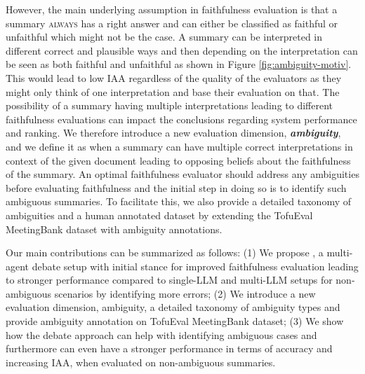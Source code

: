 However, the main underlying assumption in faithfulness evaluation is that a summary \textsc{always} has a right answer and can either be classified as faithful or unfaithful which might not be the case. 
A summary can be interpreted in different correct and plausible ways and then depending on the interpretation can be seen as both faithful and unfaithful as shown in Figure \ref{fig:ambiguity-motiv}. This would lead to low IAA regardless of the quality of the evaluators as they might only think of one interpretation and base their evaluation on that. 
The possibility of a summary having multiple interpretations leading to different faithfulness evaluations can impact the conclusions regarding system performance and ranking.
We therefore introduce a new evaluation dimension, \textbf{\textit{ambiguity}}, and we define it as when a summary can have multiple correct interpretations in context of the given document leading to opposing beliefs about the faithfulness of the summary. 
An optimal faithfulness evaluator should address any ambiguities before evaluating faithfulness and the initial step in doing so is to identify such ambiguous summaries.
To facilitate this, we also provide a detailed taxonomy of ambiguities and a human annotated dataset by extending the TofuEval MeetingBank dataset \cite{tang2024tofueval} with ambiguity annotations.

Our main contributions can be summarized as follows:
(1) We propose \method, a multi-agent debate setup with initial stance for improved faithfulness evaluation leading to stronger performance compared to single-LLM and multi-LLM setups for non-ambiguous scenarios by identifying more errors;
(2) We introduce a new evaluation dimension, ambiguity, a detailed taxonomy of ambiguity types and provide ambiguity annotation on TofuEval MeetingBank dataset;
(3) We show how the debate approach can help with identifying ambiguous cases and furthermore can even have a stronger performance in terms of accuracy and increasing IAA, when evaluated on non-ambiguous summaries.
